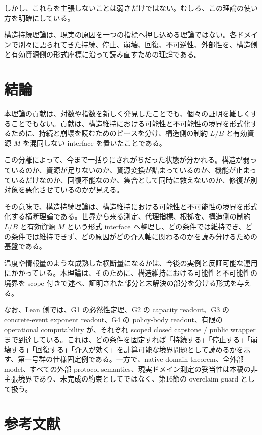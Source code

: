 \documentclass[12pt,a4paper]{article}
\begin{document}
しかし、これらを主張しないことは弱さだけではない。むしろ、この理論の使い方を明確にしている。

構造持続理論は、現実の原因を一つの指標へ押し込める理論ではない。各ドメインで別々に語られてきた持続、停止、崩壊、回復、不可逆性、外部性を、構造側と有効資源側の形式座標に沿って読み直すための理論である。

\section{結論}\label{ux7d50ux8ad6}

本理論の貢献は、対数や指数を新しく発見したことでも、個々の証明を難しくすることでもない。貢献は、構造維持における可能性と不可能性の境界を形式化するために、持続と崩壊を読むためのピースを分け、構造側の制約 \(L/B\) と有効資源 \(M\) を混同しない interface を置いたことである。

この分離によって、今まで一括りにされがちだった状態が分かれる。構造が弱っているのか、資源が足りないのか、資源変換が詰まっているのか、機能が止まっているだけなのか、回復不能なのか、集合として同時に救えないのか、修復が別対象を悪化させているのかが見える。

その意味で、構造持続理論は、構造維持における可能性と不可能性の境界を形式化する横断理論である。世界から来る測定、代理指標、根拠を、構造側の制約 \(L/B\) と有効資源 \(M\) という形式 interface へ整理し、どの条件では維持でき、どの条件では維持できず、どの原因がどの介入軸に関わるのかを読み分けるための基盤である。

温度や情報量のような成熟した横断量になるかは、今後の実例と反証可能な運用にかかっている。本理論は、そのために、構造維持における可能性と不可能性の境界を scope 付きで述べ、証明された部分と未解決の部分を分ける形式を与える。

なお、Lean 側では、G1 の必然性定理、G2 の capacity readout、G3 の concrete-event exponent readout、G4 の policy-body readout、有限の operational computability が、それぞれ scoped closed capstone / public wrapper まで到達している。これは、どの条件を固定すれば「持続する」「停止する」「崩壊する」「回復する」「介入が効く」を計算可能な境界問題として読めるかを示す、第一号群の仕様固定例である。一方で、native domain theorem、全外部 model、すべての外部 protocol semantics、現実ドメイン測定の妥当性は本稿の非主張境界であり、未完成の約束としてではなく、第16節の overclaim guard として扱う。

\section{参考文献}\label{ux53c2ux8003ux6587ux732e}
\end{document}
